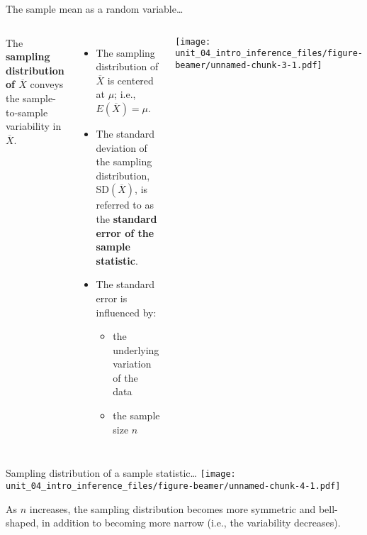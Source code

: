 \documentclass[
  ignorenonframetext,
  aspectratio=169]{beamer}
\newcommand{\columnsbegin}{\begin{columns}}
\newcommand{\columnsend}{\end{columns}}
\begin{document}
\begin{frame}{The sample mean as a random variable\ldots{}}
\protect\hypertarget{the-sample-mean-as-a-random-variable-1}{}
\columnsbegin


\small

The \textbf{sampling distribution of $\overline{X}$} conveys the
sample-to-sample variability in \(\overline{X}\).

\begin{itemize}
    
  \small

  \item The sampling distribution of $\overline{X}$ is centered at $\mu$; i.e., $E(\overline{X}) = \mu$.
    
  \item The standard deviation of the sampling distribution, SD$(\overline{X})$, is referred to as the \textbf{standard error of the sample statistic}.
    
  \item The standard error is influenced by:
    
  \begin{itemize}
    
    \item the underlying variation of the data
        
    \item the sample size $n$

\end{itemize}

\end{itemize}

\scriptsize


\scriptsize

\texttt{[image: unit\_04\_intro\_inference\_files/figure-beamer/unnamed-chunk-3-1.pdf]}

\columnsend
\end{frame}

\begin{frame}{Sampling distribution of a sample statistic\ldots{}}
\protect\hypertarget{sampling-distribution-of-a-sample-statistic}{}
\texttt{[image: unit\_04\_intro\_inference\_files/figure-beamer/unnamed-chunk-4-1.pdf]}

\footnotesize

As \(n\) increases, the sampling distribution becomes more symmetric and
bell-shaped, in addition to becoming more narrow (i.e., the variability
decreases).
\end{frame}
\end{document}
